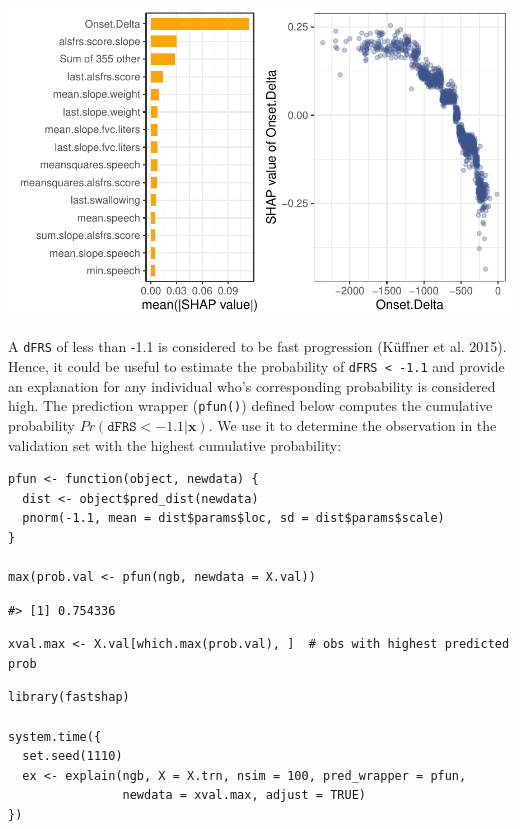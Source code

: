 \includegraphics[width=1\linewidth]{greenwell_files/figure-latex/als-ngboost-shap-1}

A \texttt{dFRS} of less than -1.1 is considered to be fast progression (Küffner et al. 2015). Hence, it could be useful to estimate the probability of \texttt{dFRS\ \textless{}\ -1.1} and provide an explanation for any individual who's corresponding probability is considered high. The prediction wrapper (\texttt{pfun()}) defined below computes the cumulative probability \(Pr\left(\texttt{dFRS} < -1.1 | \boldsymbol{x}\right)\). We use it to determine the observation in the validation set with the highest cumulative probability:

\begin{verbatim}
pfun <- function(object, newdata) {
  dist <- object$pred_dist(newdata)
  pnorm(-1.1, mean = dist$params$loc, sd = dist$params$scale)
}

max(prob.val <- pfun(ngb, newdata = X.val))
\end{verbatim}

\begin{verbatim}
#> [1] 0.754336
\end{verbatim}

\begin{verbatim}
xval.max <- X.val[which.max(prob.val), ]  # obs with highest predicted prob
\end{verbatim}

\begin{verbatim}
library(fastshap)

system.time({
  set.seed(1110)
  ex <- explain(ngb, X = X.trn, nsim = 100, pred_wrapper = pfun, 
                newdata = xval.max, adjust = TRUE)
})
\end{verbatim}

